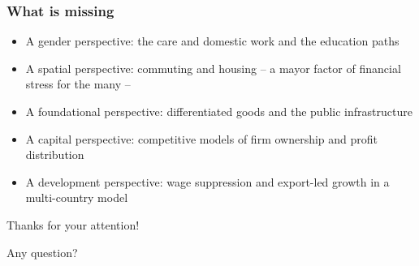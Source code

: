 \documentclass[]{beamer}
\begin{document}
\begin{frame}
	\frametitle{What is missing}
	\begin{itemize}
		\item A gender perspective: the care and domestic work and the education paths
		\item A spatial perspective: commuting and housing -- a mayor factor of financial stress for the many --
		\item A foundational perspective: differentiated goods and the public infrastructure
		\item A capital perspective: competitive models of firm ownership and profit distribution
		\item A development perspective: wage suppression and export-led growth in a multi-country model
	\end{itemize}
\end{frame}

\begin{frame}
	\centering
	Thanks for your attention!

	Any question?
\end{frame}
\end{document}
